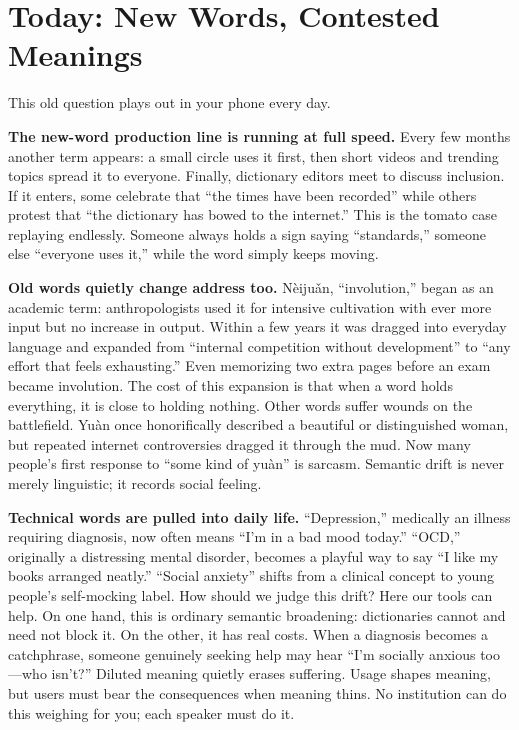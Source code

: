 \section{Today: New Words, Contested Meanings}
This old question plays out in your phone every day.

\textbf{The new-word production line is running at full speed.} Every few months another term appears: a small circle uses it first, then short videos and trending topics spread it to everyone. Finally, dictionary editors meet to discuss inclusion. If it enters, some celebrate that ``the times have been recorded'' while others protest that ``the dictionary has bowed to the internet.'' This is the tomato case replaying endlessly. Someone always holds a sign saying ``standards,'' someone else ``everyone uses it,'' while the word simply keeps moving.

\textbf{Old words quietly change address too.} Nèijuǎn, ``involution,'' began as an academic term: anthropologists used it for intensive cultivation with ever more input but no increase in output. Within a few years it was dragged into everyday language and expanded from ``internal competition without development'' to ``any effort that feels exhausting.'' Even memorizing two extra pages before an exam became involution. The cost of this expansion is that when a word holds everything, it is close to holding nothing. Other words suffer wounds on the battlefield. Yuàn once honorifically described a beautiful or distinguished woman, but repeated internet controversies dragged it through the mud. Now many people's first response to ``some kind of yuàn'' is sarcasm. Semantic drift is never merely linguistic; it records social feeling.

\textbf{Technical words are pulled into daily life.} ``Depression,'' medically an illness requiring diagnosis, now often means ``I'm in a bad mood today.'' ``OCD,'' originally a distressing mental disorder, becomes a playful way to say ``I like my books arranged neatly.'' ``Social anxiety'' shifts from a clinical concept to young people's self-mocking label. How should we judge this drift? Here our tools can help. On one hand, this is ordinary semantic broadening: dictionaries cannot and need not block it. On the other, it has real costs. When a diagnosis becomes a catchphrase, someone genuinely seeking help may hear ``I'm socially anxious too---who isn't?'' Diluted meaning quietly erases suffering. Usage shapes meaning, but users must bear the consequences when meaning thins. No institution can do this weighing for you; each speaker must do it.

